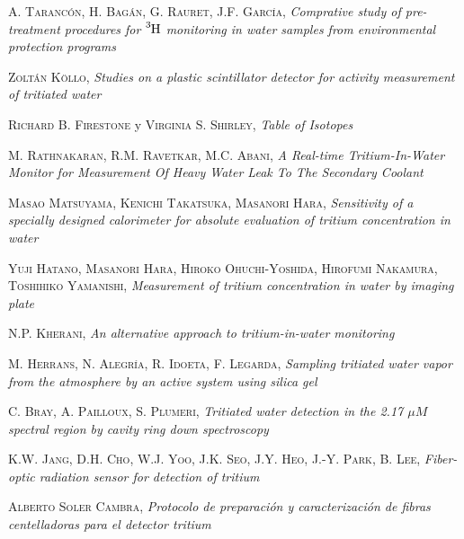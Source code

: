 \begin{thebibliography}{99}
 \textsc{A. Tarancón}, \textsc{H. Bagán}, \textsc{G. Rauret}, \textsc{J.F. García},
\textit{Comprative study of pre-treatment procedures for $\ce{^{3}H}$ monitoring in water samples from environmental protection programs}

 \textsc{Zoltán Köllo},
\textit{Studies on a plastic scintillator detector for activity measurement of tritiated water}

 \textsc{Richard B. Firestone} y \textsc{Virginia S. Shirley},
\textit{Table of Isotopes}

 \textsc{M. Rathnakaran}, \textsc{R.M. Ravetkar}, \textsc{M.C. Abani},
\textit{A Real-time Tritium-In-Water Monitor for Measurement Of Heavy Water Leak To The Secondary Coolant}

 \textsc{Masao Matsuyama}, \textsc{Kenichi Takatsuka}, \textsc{Masanori Hara}, 
\textit{Sensitivity of a specially designed calorimeter for absolute evaluation of tritium concentration in water}

 \textsc{Yuji Hatano}, \textsc{Masanori Hara}, \textsc{Hiroko Ohuchi-Yoshida}, \textsc{Hirofumi Nakamura}, \textsc{Toshihiko Yamanishi},
\textit{Measurement of tritium concentration in water by imaging plate}

\textsc{N.P. Kherani},
\textit{An alternative approach to tritium-in-water monitoring}

 \textsc{M. Herrans}, \textsc{N. Alegría}, \textsc{R. Idoeta}, \textsc{F. Legarda},
\textit{Sampling tritiated water vapor from the atmosphere by an active system using silica gel}

 \textsc{C. Bray}, \textsc{A. Pailloux}, \textsc{S. Plumeri},
\textit{Tritiated water detection in the 2.17 $\mu M$ spectral region by cavity ring down spectroscopy}

 \textsc{K.W. Jang}, \textsc{D.H. Cho}, \textsc{W.J. Yoo}, \textsc{J.K. Seo}, \textsc{J.Y. Heo}, \textsc{J.-Y. Park}, \textsc{B. Lee},
\textit{Fiber-optic radiation sensor for detection of tritium}

 \textsc{Alberto Soler Cambra},
\textit{Protocolo de preparación y caracterización de fibras centelladoras para el detector tritium}


\end{thebibliography}
